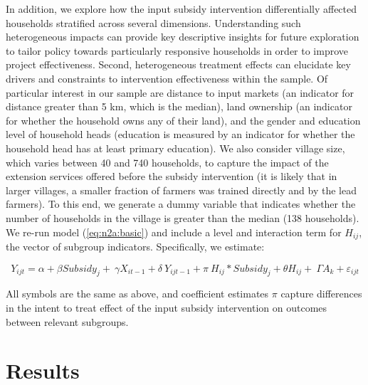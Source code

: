 In addition, we explore how the input subsidy intervention differentially affected households stratified across several dimensions. Understanding such heterogeneous impacts can provide key descriptive insights for future exploration to tailor policy towards particularly responsive households in order to improve project effectiveness. Second, heterogeneous treatment effects can elucidate key drivers and constraints to intervention effectiveness within the sample. Of particular interest in our sample are distance to input markets (an indicator for distance greater than 5 km, which is the median), land ownership (an indicator for whether the household owns any of their land), and the gender and education level of household heads (education is measured by an indicator for whether the household head has at least primary education). We also consider village size, which varies between 40 and 740 households, to capture the impact of the extension services offered before the subsidy intervention (it is likely that in larger villages, a smaller fraction of farmers was trained directly and by the lead farmers). To this end, we generate a dummy variable that indicates whether the number of households in the village is greater than the median (138 households). We re-run model (\ref{eq:n2a:basic}) and include a level and interaction term for $H_{ij}$, the vector of subgroup indicators. Specifically, we estimate:

\begin{equation}
\label{eq:n2a:hte}
Y_{ijt}=\alpha+{\beta Subsidy}_j+\ \gamma X_{it-1}+{\delta\ Y}_{ijt-1}+\pi\ H_{ij}\ast{Subsidy}_j+\theta H_{ij}+\ \Gamma A_k+\varepsilon_{ijt}
\end{equation}

All symbols are the same as above, and coefficient estimates $\pi$ capture differences in the intent to treat effect of the input subsidy intervention on outcomes between relevant subgroups.

\section{Results}



